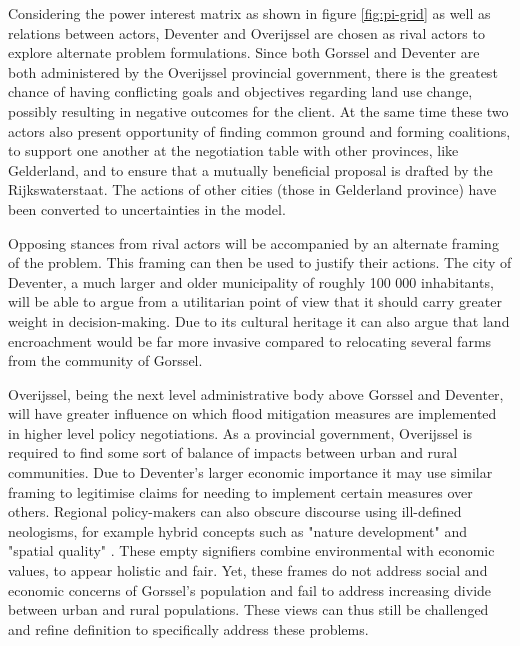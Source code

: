 \bigskip 
Considering the power interest matrix as shown in figure \ref{fig:pi-grid} as well as relations between actors, Deventer and Overijssel are chosen as rival actors to explore alternate problem formulations. Since both Gorssel and Deventer are both administered by the Overijssel provincial government, there is the greatest chance of having conflicting goals and objectives regarding land use change, possibly resulting in negative outcomes for the client. At the same time these two actors also present opportunity of finding common ground and forming coalitions, to support one another at the negotiation table with other provinces, like Gelderland, and to ensure that a mutually beneficial proposal is drafted by the Rijkswaterstaat. The actions of other cities (those in Gelderland province) have been converted to uncertainties in the model.

\bigskip 

Opposing stances from rival actors will be accompanied by an alternate framing of the problem. This framing can then be used to justify their actions. The city of Deventer, a much larger and older municipality of roughly 100 000 inhabitants, will be able to argue from a utilitarian point of view that it should carry greater weight in decision-making. Due to its cultural heritage it can also argue that land encroachment would be far more invasive compared to relocating several farms from the community of Gorssel. 

Overijssel, being the next level administrative body above Gorssel and Deventer, will have greater influence on which flood mitigation measures are implemented in higher level policy negotiations. As a provincial government, Overijssel is required to find some sort of balance of impacts between urban and rural communities. Due to Deventer's larger economic importance it may use similar framing to legitimise claims for needing to implement certain measures over others. Regional policy-makers can also obscure discourse using ill-defined neologisms, for example hybrid concepts such as "nature development" and "spatial quality" \parencite{warner_implementing_2011}. These empty signifiers combine environmental with economic values, to appear holistic and fair. Yet, these frames do not address social and economic concerns of Gorssel's population and fail to address increasing divide between urban and rural populations. These views can thus still be challenged and refine definition to specifically address these problems.

